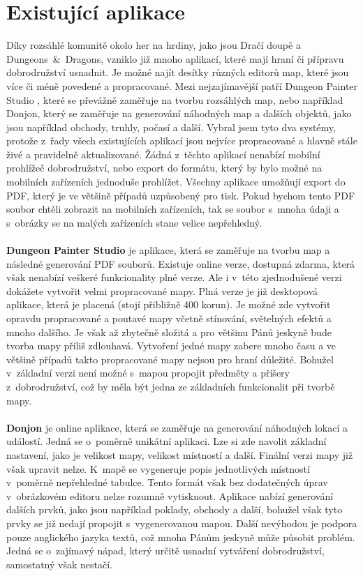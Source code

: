 \documentclass[thesis=B,czech]{resources/FITthesis}[2012/06/26]
\begin{document}
	\section{Existující aplikace}
Díky rozsáhlé komunitě okolo her na hrdiny, jako jsou Dračí doupě a Dungeons~\&~Dragons, vzniklo již mnoho aplikací, které mají hraní či přípravu dobrodružství usnadnit. Je možné najít desítky různých editorů map, které jsou více či méně povedené a propracované. Mezi nejzajímavější patří  Dungeon Painter Studio \cite{dungeoPainterStudio}, které se převážně zaměřuje na tvorbu rozsáhlých map, nebo například Donjon\cite{donjon}, který se zaměřuje na generování náhodných map a dalších objektů, jako jsou například obchody, truhly, počasí a další. Vybral jsem tyto dva systémy, protože z~řady všech existujících aplikací jsou nejvíce propracované a hlavně stále živé a pravidelně aktualizované. Žádná z~těchto aplikací nenabízí mobilní prohlížeč dobrodružství, nebo export do formátu, který by bylo možné na mobilních zařízeních jednoduše prohlížet. Všechny aplikace umožňují export do PDF, který je ve většině případů uzpůsobený pro tisk. Pokud bychom tento PDF soubor chtěli zobrazit na mobilních zařízeních, tak se soubor s~mnoha údaji a s~obrázky se na malých zařízeních stane velice nepřehledný. \\
\\
\textbf{Dungeon Painter Studio} je aplikace, která se zaměřuje na tvorbu map a následné generování PDF souborů. Existuje online verze, dostupná zdarma, která však nenabízí veškeré funkcionality plné verze. Ale i v~této zjednodušené verzi dokážete vytvořit velmi propracované mapy. Plná verze je již desktopová aplikace, která je placená (stojí  přibližně 400 korun). Je možné zde vytvořit opravdu propracované a poutavé mapy včetně stínování, světelných efektů a mnoho dalšího. Je však až zbytečně složitá a pro většinu Pánů jeskyně bude tvorba mapy příliš zdlouhavá. Vytvoření jedné mapy zabere mnoho času a ve většině případů takto propracované mapy nejsou pro hraní důležité. Bohužel v~základní verzi není možné s~mapou propojit předměty a příšery z~dobrodružství, což by měla být jedna ze základních funkcionalit při tvorbě mapy.\\
\\
\textbf{Donjon} je online aplikace, která se zaměřuje na generování náhodných lokací a událostí. Jedná se o~poměrně unikátní aplikaci. Lze si zde navolit základní nastavení, jako je velikost mapy, velikost místností a další. Finální verzi mapy již však upravit nelze. K~mapě se vygeneruje popis jednotlivých místností v~poměrně nepřehledné tabulce. Tento formát však bez dodatečných úprav v~obrázkovém editoru nelze rozumně vytisknout. Aplikace nabízí generování dalších prvků, jako jsou například poklady, obchody a další, bohužel však tyto prvky se již nedají propojit s~vygenerovanou mapou. Další nevýhodou je podpora pouze anglického jazyka textů, což mnoha Pánům jeskyně může působit problém. Jedná se o~zajímavý nápad, který určitě usnadní vytváření dobrodružství, samostatný však nestačí.
\end{document}
